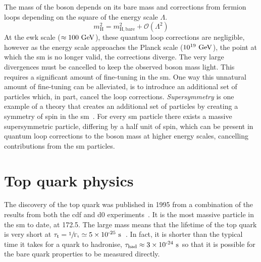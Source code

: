 The mass of the \Hboson{} boson depends on its bare mass and corrections from fermion loops depending on the square of the energy scale $\Lambda$.
\begin{equation*}
	m_{\mathrm{H}}^{2} = m_{\mathrm{H, bare}}^{2} + \mathcal{O}(\Lambda^{2})
\end{equation*}
At the \acrshort{ewk} scale ($\approx100\mathrm{~Ge\hspace{-.08em}V}^{}$), these quantum loop corrections are negligible, however as the energy scale approaches the Planck scale ($10^{19}\mathrm{~Ge\hspace{-.08em}V}^{}$), the point at which the \acrshort{sm} is no longer valid, the corrections diverge.
The very large divergences must be cancelled to keep the observed \Hboson{} boson mass light.
This requires a significant amount of fine-tuning in the \acrshort{sm}.
One way this unnatural amount of fine-tuning can be alleviated, is to introduce an additional set of particles which, in part, cancel the loop corrections.
\textit{Supersymmetry} is one example of a theory that creates an additional set of particles by creating a symmetry of spin in the \acrshort{sm}~\cite{Th:SUSY}.
For every \acrshort{sm} particle there exists a massive supersymmetric particle, differing by a half unit of spin, which can be present in quantum loop corrections to the \Hboson{} boson mass at higher energy scales, cancelling contributions from the \acrshort{sm} particles.






\section{Top quark physics} %
\label{sec:top_quark_physics}

The discovery of the top quark was published in 1995 from a combination of the results from both the \acrshort{cdf} and \acrshort{d0} experiments~\cite{Th:TopCDF,Th:TopD0}.
It is the most massive particle in the \acrshort{sm} to date, at 172.5\GeV{}.
The large mass means that the lifetime of the top quark is very short at $\tau_{\mathrm{t}} = \sfrac{1}{\Gamma_{\mathrm{t}}} \simeq 5\times \text{10}^\text{-25}\mathrm{~s}^{}$~\cite{PDG}.
In fact, it is shorter than the typical time it takes for a quark to hadronise, $\tau_{\mathrm{had}} \approx 3\times \text{10}^\text{-24}\mathrm{~s}^{}$ so that it is possible for the bare quark properties to be measured directly.

